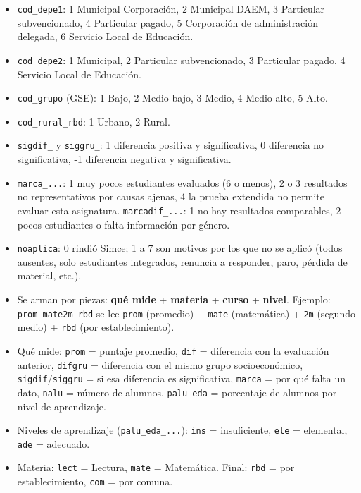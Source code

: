 \documentclass[10.5pt]{article}
\begin{document}
\begin{formulabox}
\begin{itemize}[leftmargin=1.1em,itemsep=2pt,topsep=2pt]
\item \texttt{cod\_\allowbreak{}depe1}: 1 Municipal Corporación, 2 Municipal DAEM, 3 Particular subvencionado, 4 Particular pagado, 5 Corporación de administración delegada, 6 Servicio Local de Educación.
\item \texttt{cod\_\allowbreak{}depe2}: 1 Municipal, 2 Particular subvencionado, 3 Particular pagado, 4 Servicio Local de Educación.
\item \texttt{cod\_\allowbreak{}grupo} (GSE): 1 Bajo, 2 Medio bajo, 3 Medio, 4 Medio alto, 5 Alto.
\item \texttt{cod\_\allowbreak{}rural\_\allowbreak{}rbd}: 1 Urbano, 2 Rural.
\item \texttt{sigdif\_\allowbreak{}} y \texttt{siggru\_\allowbreak{}}: 1 diferencia positiva y significativa, 0 diferencia no significativa, -1 diferencia negativa y significativa.
\item \texttt{marca\_\allowbreak{}...}: 1 muy pocos estudiantes evaluados (6 o menos), 2 o 3 resultados no representativos por causas ajenas, 4 la prueba extendida no permite evaluar esta asignatura. \texttt{marcadif\_\allowbreak{}...}: 1 no hay resultados comparables, 2 pocos estudiantes o falta información por género.
\item \texttt{noaplica}: 0 rindió Simce; 1 a 7 son motivos por los que no se aplicó (todos ausentes, solo estudiantes integrados, renuncia a responder, paro, pérdida de material, etc.).
\end{itemize}
\end{formulabox}

\begin{estrategiabox}
\begin{itemize}[leftmargin=1.1em,itemsep=2pt,topsep=2pt]
\item Se arman por piezas: \textbf{qué mide} + \textbf{materia} + \textbf{curso} + \textbf{nivel}. Ejemplo: \texttt{prom\_\allowbreak{}mate2m\_\allowbreak{}rbd} se lee \texttt{prom} (promedio) + \texttt{mate} (matemática) + \texttt{2m} (segundo medio) + \texttt{rbd} (por establecimiento).
\item Qué mide: \texttt{prom} = puntaje promedio, \texttt{dif} = diferencia con la evaluación anterior, \texttt{difgru} = diferencia con el mismo grupo socioeconómico, \texttt{sigdif}/\texttt{siggru} = si esa diferencia es significativa, \texttt{marca} = por qué falta un dato, \texttt{nalu} = número de alumnos, \texttt{palu\_\allowbreak{}eda} = porcentaje de alumnos por nivel de aprendizaje.
\item Niveles de aprendizaje (\texttt{palu\_\allowbreak{}eda\_\allowbreak{}...}): \texttt{ins} = insuficiente, \texttt{ele} = elemental, \texttt{ade} = adecuado.
\item Materia: \texttt{lect} = Lectura, \texttt{mate} = Matemática. Final: \texttt{rbd} = por establecimiento, \texttt{com} = por comuna.
\end{itemize}
\end{estrategiabox}
\end{document}
